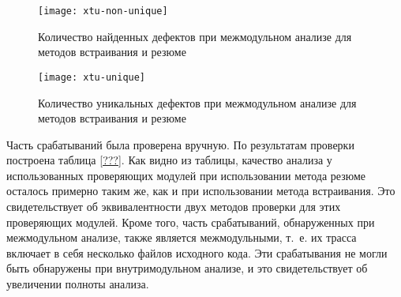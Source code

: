 \begin{figure}[h]
   \centering
   \texttt{[image: xtu-non-unique]}
   \caption{Количество найденных дефектов при межмодульном анализе для методов встраивания и резюме}\label{pic:xtu-non-unique}
\end{figure}


\begin{figure}[h]
   \centering
   \texttt{[image: xtu-unique]}
   \caption{Количество уникальных дефектов при межмодульном анализе для методов встраивания и резюме}\label{pic:xtu-unique}
\end{figure}

Часть срабатываний была проверена вручную. По результатам проверки построена таблица \ref{???}. Как видно из таблицы, качество анализа у использованных проверяющих модулей при использовании метода резюме осталось примерно таким же, как и при использовании метода встраивания. Это свидетельствует об эквивалентности двух методов проверки для этих проверяющих модулей. Кроме того, часть срабатываний, обнаруженных при межмодульном анализе, также является межмодульными, т.~е. их трасса включает в себя несколько файлов исходного кода. Эти срабатывания не могли быть обнаружены при внутримодульном анализе, и это свидетельствует об увеличении полноты анализа.

